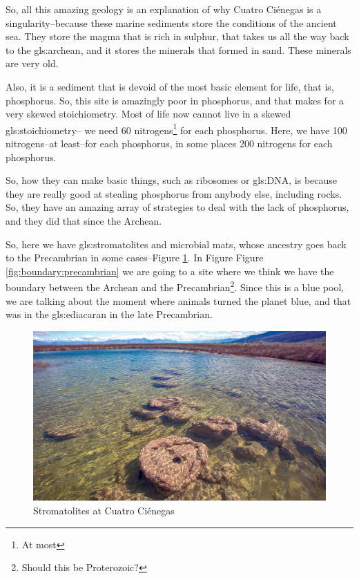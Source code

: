 \documentclass[]{article}
\begin{document}
So, all this amazing geology is an explanation of why Cuatro  Ci\'enegas is a singularity--because these marine sediments store the conditions of the ancient sea. They store the magma that is rich in sulphur, that takes us all the way back to the \gls{gls:archean}, and it stores the minerals that formed in sand. These minerals are very old.

Also, it is a sediment that is devoid of the most basic element for life, that is, phosphorus. So, this site is amazingly poor in phosphorus, and that makes for a very
skewed stoichiometry. Most of life now cannot live in a skewed \gls{gls:stoichiometry}-- we need 60 nitrogens\footnote{At most} for each phosphorus. Here, we have 100 nitrogens--at least--for each phosphorus, in some places 200 nitrogens for each phosphorus.

So, how they can make basic things, such as ribosomes or \gls{gls:DNA}, is because they are really good at stealing phosphorus from anybody else, including rocks. So, they have an amazing array of strategies to deal with the lack of phosphorus, and they did that since the Archean.

So, here we have \glspl{gls:stromatolite} and microbial mats, whose ancestry goes back
to the Precambrian in some cases--Figure \ref{fig:ma_0703_NF_CuatroCienegas_stromatolite_1280}. In Figure  Figure \ref{fig:boundary:precambrian} we are going to a site where we think we have the boundary between the Archean and the Precambrian\footnote{Should this be Proterozoic?}. Since this is a blue pool, we are talking about the moment where animals turned the planet blue, and that was in the \gls{gls:ediacaran} in the late Precambrian.

\begin{figure}[H]
	\caption[Stromatolites at Cuatro Ci\'enegas]{Stromatolites at Cuatro Ci\'enegas \cite{perezortega2020pools}}\label{fig:ma_0703_NF_CuatroCienegas_stromatolite_1280}
	\includegraphics[width=\textwidth]{ma_0703_NF_CuatroCienegas_stromatolite_1280}
\end{figure}
\end{document}
